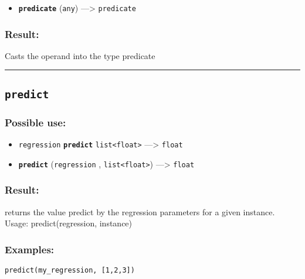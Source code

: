 \documentclass[]{book}
\providecommand{\tightlist}{%
  \setlength{\itemsep}{0pt}\setlength{\parskip}{0pt}}
\theoremstyle{definition}
\theoremstyle{definition}
\theoremstyle{definition}
\theoremstyle{remark}
\begin{document}
\begin{itemize}
\tightlist
\item
  \textbf{\texttt{predicate}} (\texttt{any}) ---\textgreater{}
  \texttt{predicate}
\end{itemize}

\subsubsection{Result:}\label{result-402}

Casts the operand into the type predicate

\begin{center}\rule{0.5\linewidth}{\linethickness}\end{center}

\subsection{\texorpdfstring{\texttt{predict}}{predict}}\label{predict}

\subsubsection{Possible use:}\label{possible-use-417}

\begin{itemize}
\tightlist
\item
  \texttt{regression} \textbf{\texttt{predict}}
  \texttt{list\textless{}float\textgreater{}} ---\textgreater{}
  \texttt{float}
\item
  \textbf{\texttt{predict}} (\texttt{regression} ,
  \texttt{list\textless{}float\textgreater{}}) ---\textgreater{}
  \texttt{float}
\end{itemize}

\subsubsection{Result:}\label{result-403}

returns the value predict by the regression parameters for a given
instance. Usage: predict(regression, instance)

\subsubsection{Examples:}\label{examples-290}

\begin{verbatim}
predict(my_regression, [1,2,3]) 
\end{verbatim}
\end{document}
